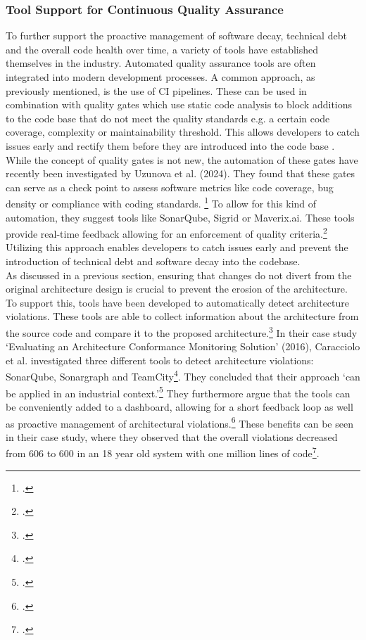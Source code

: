 \subsubsection{Tool Support for Continuous Quality Assurance}
To further support the proactive management of software decay, technical debt and the overall code health over time, a variety of tools have established themselves in the industry.
Automated quality assurance tools are often integrated into modern development processes. A common approach, as previously mentioned, is the use of \ac{CI} pipelines. These can be used in combination with quality gates which use static code analysis to block additions to the code base that do not meet the quality standards e.g. a 
certain code coverage, complexity or maintainability threshold. This allows developers to catch issues early and rectify them before they are introduced into the code base . While the concept of quality gates is not new, the automation of these gates have recently been investigated by Uzunova et al. (2024).
They found that these gates can serve as a check point to assess software metrics like code coverage, bug density or compliance with coding standards. \footcite[8]{uzunovaQualityGatesSoftware2024}
To allow for this kind of automation, they suggest tools like SonarQube, Sigrid or Maverix.ai. These tools provide real-time feedback allowing for an enforcement of quality criteria.\footcite[8]{uzunovaQualityGatesSoftware2024}\\
Utilizing this approach enables developers to catch issues early and prevent the introduction of technical debt and software decay into the codebase.\\

As discussed in a previous section, ensuring that changes do not divert from the original architecture design is crucial to prevent the erosion of the architecture.
To support this, tools have been developed to automatically detect architecture violations. These tools are able to collect information about the architecture from the source code
and compare it to the proposed architecture.\footcite[6]{thomasStaticDynamicArchitecture2017} In their case study 
`Evaluating an Architecture Conformance Monitoring Solution' (2016), Caracciolo et al. investigated three different tools to detect architecture violations:
SonarQube, Sonargraph and TeamCity\footcite[43]{caraccioloEvaluatingArchitectureConformance2016}. They concluded that their approach 
`can be applied in an industrial context.'\footcite[44]{caraccioloEvaluatingArchitectureConformance2016}
They furthermore argue that the tools can be conveniently added to a dashboard, allowing for a short feedback loop as well as proactive management of architectural violations.\footcite[44]{caraccioloEvaluatingArchitectureConformance2016}
These benefits can be seen in their case study, where they observed that the overall violations decreased from 606 to 600 in an 18 year old system with one million lines of code\footcite[43]{caraccioloEvaluatingArchitectureConformance2016}.\\

